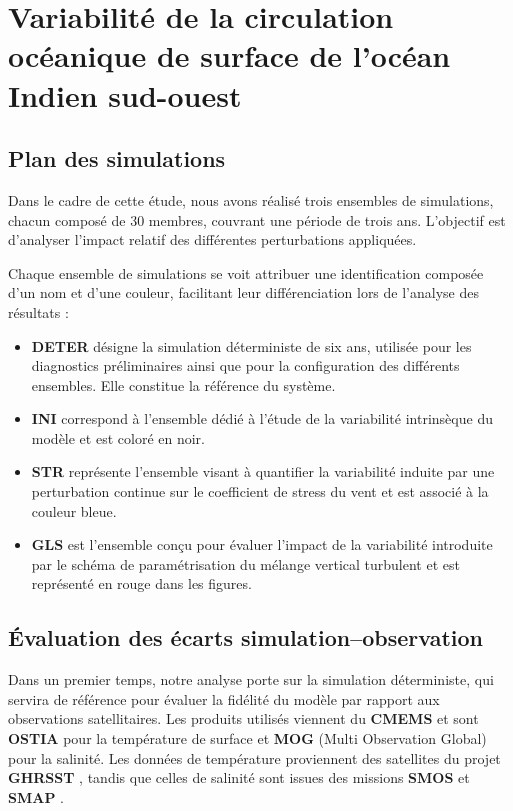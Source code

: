 \chapter{Variabilité de la circulation océanique de surface de l'océan Indien sud-ouest} 

\section{Plan des simulations}

Dans le cadre de cette étude, nous avons réalisé trois ensembles de simulations, chacun composé de 30 membres, couvrant une période de trois ans. L’objectif est d’analyser l'impact relatif des différentes perturbations appliquées. 

Chaque ensemble de simulations se voit attribuer une identification composée d’un nom et d’une couleur, facilitant leur différenciation lors de l’analyse des résultats :

\begin{itemize}
	\item \textbf{DETER} désigne la simulation déterministe de six ans, utilisée pour les diagnostics préliminaires ainsi que pour la configuration des différents ensembles. Elle constitue la référence du système.
	
	\item \textbf{INI} correspond à l’ensemble dédié à l’étude de la variabilité intrinsèque du modèle et est coloré en noir.
	
	\item \textbf{STR} représente l’ensemble visant à quantifier la variabilité induite par une perturbation continue sur le coefficient de stress du vent et est associé à la couleur bleue.
	
	\item \textbf{GLS} est l’ensemble conçu pour évaluer l’impact de la variabilité introduite par le schéma de paramétrisation du mélange vertical turbulent et est représenté en rouge dans les figures.
\end{itemize}

\section{Évaluation des écarts simulation–observation}

Dans un premier temps, notre analyse porte sur la simulation déterministe, qui servira de référence pour évaluer la fidélité du modèle par rapport aux observations satellitaires. Les produits utilisés viennent du \textbf{CMEMS} \cite{noauthor_accueil_nodate} et sont \textbf{OSTIA}\cite{european_union-copernicus_marine_service_global_2015} pour la température de surface et \textbf{MOG} \cite{european_union-copernicus_marine_service_multi_2020} (Multi Observation Global) pour la salinité. Les données de température proviennent des satellites du projet \textbf{GHRSST }\cite{martin_group_2012, dash_group_2012}, tandis que celles de salinité sont issues des missions \textbf{SMOS} \cite{kerr_smos_2010} et \textbf{SMAP} \cite{oneill_nasa_2010}.

